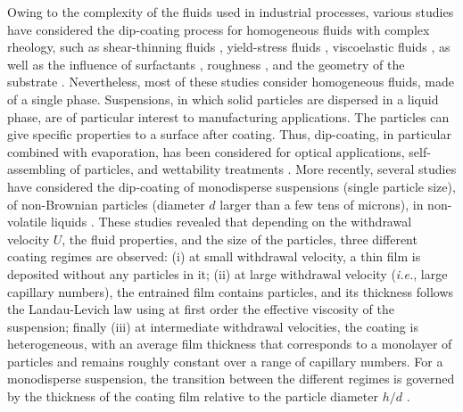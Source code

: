 \documentclass{jfm}
\begin{document}
Owing to the complexity of the fluids used in industrial processes, various studies have considered the dip-coating process for homogeneous fluids with complex rheology,
such as shear-thinning fluids \cite[][]{gutfinger1965films,hewson2009model},
yield-stress fluids \cite[][]{maillard2014solid,maillard2015flow,smit2019stress},
viscoelastic fluids \cite[][]{ro1995viscoelastic,de1998fluid,ruckenstein2002scaling},
as well as the influence of surfactants 
\cite[][]{shen2002fiber,krechetnikov2006surfactant,delacotte2012plate},
roughness \cite[][]{krechetnikov2005experimental,seiwert2011coating},
and the geometry of the substrate \cite[][]{white1965static,zhang2021dip}. Nevertheless, most of these studies consider homogeneous fluids, made of a single phase.
Suspensions, in which solid particles are dispersed in a liquid phase, are of particular interest to manufacturing applications. The particles can give specific properties to a surface after coating. Thus, dip-coating, in particular combined with evaporation, has been considered for optical applications, self-assembling of particles, and wettability treatments \cite[][]{ghosh2007spontaneous,mechiakh2010correlation, berteloot2013dip,mahadik2013superhydrophobic}.
More recently, several studies have considered the dip-coating of monodisperse suspensions (single particle size), of non-Brownian particles (diameter $d$ larger than a few tens of microns), in non-volatile liquids \cite[][]{kao2012spinodal,gans2019dip,palma2019dip}.
These studies revealed that depending on the withdrawal velocity $U$, the fluid properties, and the size of the particles, three different coating regimes are observed: 
(i) at small withdrawal velocity, a thin film is deposited without any particles in it;
(ii) at large withdrawal velocity (\textit{i.e.}, large capillary numbers), the entrained film contains particles, and its thickness follows the Landau-Levich law using at first order the effective viscosity of the suspension; 
finally (iii) at intermediate withdrawal velocities, the coating is heterogeneous, with an average film thickness that corresponds to a monolayer of particles and remains roughly constant over a range of capillary numbers.
For a monodisperse suspension, the transition between the different regimes is governed by the thickness of the coating film relative to the particle diameter $h/d$ \cite[][]{gans2019dip,palma2019dip}.
\end{document}
